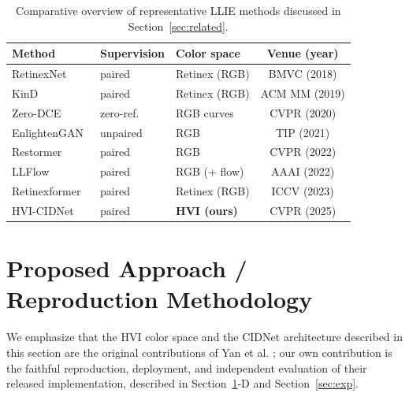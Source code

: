 \documentclass[conference]{IEEEtran}
\begin{document}
\begin{table}[t]
\centering
\caption{Comparative overview of representative LLIE methods discussed in Section~\ref{sec:related}.}
\label{tab:methods}
\begin{tabular}{lllc}
\toprule
Method & Supervision & Color space & Venue (year) \\
\midrule
RetinexNet~\cite{wei2018retinexnet} & paired & Retinex (RGB) & BMVC (2018) \\
KinD~\cite{zhang2019kindling} & paired & Retinex (RGB) & ACM MM (2019) \\
Zero-DCE~\cite{guo2020zerodce} & zero-ref. & RGB curves & CVPR (2020) \\
EnlightenGAN~\cite{jiang2021enlightengan} & unpaired & RGB & TIP (2021) \\
Restormer~\cite{zamir2022restormer} & paired & RGB & CVPR (2022) \\
LLFlow~\cite{wang2022llflow} & paired & RGB (+ flow) & AAAI (2022) \\
Retinexformer~\cite{cai2023retinexformer} & paired & Retinex (RGB) & ICCV (2023) \\
HVI-CIDNet~\cite{yan2025hvi} & paired & \textbf{HVI (ours)} & CVPR (2025) \\
\bottomrule
\end{tabular}
\end{table}

\section{Proposed Approach / Reproduction Methodology}
\label{sec:method}

We emphasize that the HVI color space and the CIDNet architecture described
in this section are the original contributions of Yan et al.
\cite{yan2025hvi,feng2024hvi}; our own contribution is the faithful
reproduction, deployment, and independent evaluation of their released
implementation, described in Section~\ref{sec:method}-D and
Section~\ref{sec:exp}.
\end{document}

